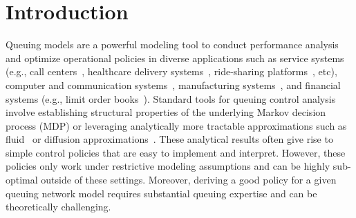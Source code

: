 \section{Introduction}
\label{section:introduction}


Queuing models are a powerful modeling tool to conduct performance analysis and optimize operational policies in diverse applications such as service systems (e.g., call centers~\cite{aksin2007modern}, healthcare delivery systems~\cite{armony2015patient}, ride-sharing platforms~\cite{banerjee2022pricing}, etc), computer and communication systems~\cite{harchol2013performance, neely2022stochastic}, manufacturing systems~\cite{shanthikumar2007queueing}, and financial systems (e.g., limit order books~\cite{cont2010stochastic}). Standard tools for queuing control analysis involve establishing structural properties of the underlying Markov decision process (MDP) or leveraging analytically more tractable approximations such as fluid~\cite{dai1995stability, chen1991discrete} or diffusion approximations~\cite{harrison1998heavy, stolyar2004maxweight, harrison1989scheduling, mandelbaum2004scheduling}. These analytical results often give rise to simple control policies that are easy to implement and interpret. However, these policies only work under restrictive modeling assumptions and can be highly sub-optimal outside of these settings. Moreover, deriving a good policy for a given queuing network model requires substantial queuing expertise and can be theoretically challenging. 

